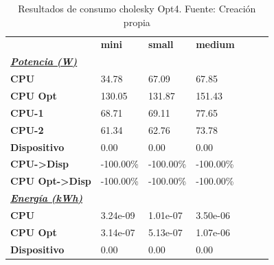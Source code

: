 \begin{table}[H]
    \centering
    \begin{tabular}{lllllll}
    \rowcolor[HTML]{DAE8FC} \ & \textbf{mini} & \textbf{	small} & \textbf{	medium} \\
    \cellcolor[HTML]{DAE8FC} \textbf{\textbf{{\emph{{\underline{{Potencia (W)}}}}}}} &  & 	 & 	 \\
    \rowcolor[HTML]{EFEFEF} \cellcolor[HTML]{DAE8FC} \textbf{CPU} & 34.78 & 	67.09 & 	67.85 \\
    \cellcolor[HTML]{DAE8FC} \textbf{CPU Opt} & 130.05 & 	131.87 & 	151.43 \\
    \rowcolor[HTML]{EFEFEF} \cellcolor[HTML]{DAE8FC} \textbf{\quad CPU-1} & 68.71 & 	69.11 & 	77.65 \\
    \cellcolor[HTML]{DAE8FC} \textbf{\quad CPU-2} & 61.34 & 	62.76 & 	73.78 \\
    \rowcolor[HTML]{EFEFEF} \cellcolor[HTML]{DAE8FC} \textbf{Dispositivo} & 0.00 & 	0.00 & 	0.00 \\
    \cellcolor[HTML]{DAE8FC} \textbf{CPU->Disp} & -100.00\% & 	-100.00\% & 	-100.00\% \\
    \rowcolor[HTML]{EFEFEF} \cellcolor[HTML]{DAE8FC} \textbf{CPU Opt->Disp} & -100.00\% & 	-100.00\% & 	-100.00\% \\
    \cellcolor[HTML]{DAE8FC} \textbf{\textbf{{\emph{{\underline{{Energía (kWh)}}}}}}} &  & 	 & 	 \\
    \rowcolor[HTML]{EFEFEF} \cellcolor[HTML]{DAE8FC} \textbf{CPU} & 3.24e-09 & 	1.01e-07 & 	3.50e-06 \\
    \cellcolor[HTML]{DAE8FC} \textbf{CPU Opt} & 3.14e-07 & 	5.13e-07 & 	1.07e-06 \\
    \rowcolor[HTML]{EFEFEF} \cellcolor[HTML]{DAE8FC} \textbf{Dispositivo} & 0.00 & 	0.00 & 	0.00 \\
    \end{tabular}
    \caption[Resultados de consumo cholesky Opt4]{{Resultados de consumo cholesky Opt4. Fuente: Creación propia}}
    \label{table_test_cholesky_Opt4_hw_powerResults}
\end{table}